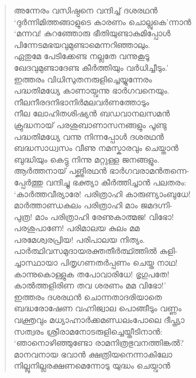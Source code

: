 \begin{verse}
അന്നേരം വസിഷ്ഠനെ വന്ദിച്ച് ദശരഥന്‍\\
‘ദുര്‍ന്നിമിത്തങ്ങാളുടെ കാരണം ചൊല്ലുകെ’ന്നാന്‍\\
‘മന്നവ! കുറഞ്ഞോരു ഭീതിയുണ്ടാകുമിപ്പോള്‍\\
പിന്നേടമഭയവുമുണ്ടാമെന്നറിഞ്ഞാലും.\\
ഏതുമേ പേടിക്കേണ്ട നല്ലതേ വന്നുകൂടൂ\\
ഖേദവുമുണ്ടാദേണ്ട കീര്‍ത്തിയും വര്‍ധിച്ചീടും.’\\
ഇത്തരം വിധിസുതനരുളിച്ചെയ്യുന്നേരം\\
പദ്ധതിമധ്യേ കാണായ്വന്നു ഭാര്‍ഗവനെയും.\\
നീലനീരദനിഭാനിര്‍മലവര്‍ണത്തോടും\\
നീല ലോഹിതശിഷ്യന്‍ ബഡവാനലസമന്‍\\
ക്രുദ്ധനായ് പരശുബാണാസനങ്ങളും പൂണ്ടു\\
പദ്ധതിമധ്യേ വന്നു നിന്നപ്പോള്‍ ദശരഥന്‍\\
ബദ്ധസാധ്വസം വീണു നമസ്കാരവും ചെയ്താന്‍\\
ബുദ്ധിയും കെട്ടു നിന്നു മറ്റുള്ള ജനങ്ങളും.\\
ആര്‍ത്തനായ് പങ്ക്തിരഥന്‍ ഭാര്‍ഗവരാമന്‍തന്നെ-\\
പ്പേര്‍ത്തു വന്ദിച്ചു ഭക്ത്യാ കീര്‍ത്തിച്ചാന്‍ പലതരം:\\
‘കാര്‍ത്തവീര്യാരേ! പരിത്രാഹി കാരുണ്യാംബുധേ!\\
മാര്‍ത്താണ്ഡകുലം പരിത്രാഹി മാം ജമദഗ്നി-\\
പുത്ര! മാം പരിത്രാഹി രേണുകാത്മജ! വിഭോ!\\
പരശുപാണേ! പരിമാലയ കുലം മമ\\
പരമേശ്വരപ്രിയ! പരിപാലയ നിത്യം.\\
പാര്‍ത്ഥിവസമുദായരക്തതീര്‍ത്ഥ്ത്തില്‍ കുളി-\\
ച്ചാസ്ഥായാ പിതൃഗണതര്‍പ്പണം ചെയ്ത നാഥ!\\
കാന്നുകൊള്ളുക തപോവാരിധേ! ഭൃഗുപതേ!\\
കാല്‍ത്തളിരിണ തവ ശരണം മമ വിഭോ!’\\
ഇത്തരം ദശരഥന്‍ ചൊന്നതാദരിയാതെ\\
ബദ്ധരോഷേണ വഹ്നിജ്വാല പൊങ്ങീടും വണ്ണം\\
വക്ത്രവും മധ്യാഹ്നാര്‍ക്കമണ്ഡലംപോലെ ദീപ്ത്യാ\\
സത്വരം ശ്രീരാമനോടരുളിച്ചെയ്തീടിനാന്‍:\\
‘ഞാനൊഴിഞ്ഞുണ്ടോ രാമനിത്രഭുവനത്തിങ്കല്‍?\\
മാനവനായ ഭവാന്‍ ക്ഷത്രിയനെന്നാകിലോ\\
നില്ലുനില്ലരക്ഷണമെന്നോടു യുദ്ധം ചെയ്വാന്‍\\

\end{verse}
